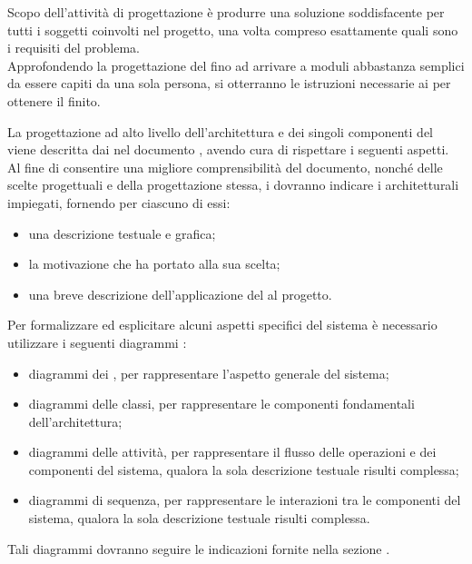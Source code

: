 Scopo dell'attività di progettazione è produrre una soluzione soddisfacente per tutti i soggetti coinvolti nel progetto, una volta compreso esattamente quali sono i requisiti del problema. \\
Approfondendo la progettazione del  fino ad arrivare a moduli abbastanza semplici da essere capiti da una sola persona, si otterranno le istruzioni necessarie ai  per ottenere il  finito.
			
La progettazione ad alto livello dell'architettura e dei singoli componenti del  \projectname{} viene descritta dai  nel documento , avendo cura di rispettare i seguenti aspetti.
Al fine di consentire una migliore comprensibilità del documento, nonché delle scelte progettuali e della progettazione stessa, i  dovranno indicare i  architetturali impiegati, fornendo per ciascuno di essi:
\begin{itemize}
\item una descrizione testuale e grafica;
\item la motivazione che ha portato alla sua scelta;
\item una breve descrizione dell'applicazione del  al progetto.
\end{itemize}
Per formalizzare ed esplicitare alcuni aspetti specifici del sistema è necessario utilizzare i seguenti diagrammi :
\begin{itemize}
\item diagrammi dei , per rappresentare l'aspetto generale del sistema;
\item diagrammi delle classi, per rappresentare le componenti fondamentali dell'architettura;
\item diagrammi delle attività, per rappresentare il flusso delle operazioni e dei componenti del sistema, qualora la sola descrizione testuale risulti complessa;
\item diagrammi di sequenza, per rappresentare le interazioni tra le componenti del sistema, qualora la sola descrizione testuale risulti complessa.
\end{itemize}
Tali diagrammi dovranno seguire le indicazioni fornite nella sezione .
				
